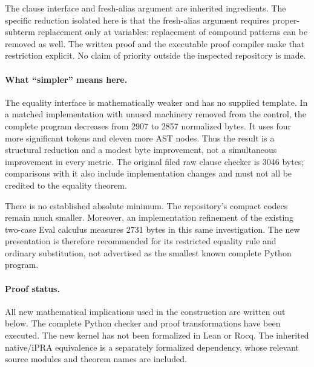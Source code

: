 The clause interface and fresh-alias argument are inherited ingredients.
The specific reduction isolated here is that the fresh-alias argument
requires proper-subterm replacement only at variables: replacement of
compound patterns can be removed as well. The written proof and the
executable proof compiler make that restriction explicit. No claim of
priority outside the inspected repository is made.

\paragraph{What ``simpler'' means here.}
The equality interface is mathematically weaker and has no supplied
template. In a matched implementation with unused machinery removed
from the control, the complete program decreases from 2907 to 2857
normalized bytes. It uses four more significant tokens and eleven more
AST nodes. Thus the result is a structural reduction and a modest byte
improvement, not a simultaneous improvement in every metric.
The original filed raw clause checker is 3046 bytes; comparisons with
it also include implementation changes and must not all be credited to
the equality theorem.

There is no established absolute minimum. The repository's compact
codecs remain much smaller. Moreover, an implementation refinement of
the existing two-case Eval calculus measures 2731 bytes in this same
investigation. The new presentation is therefore recommended for its
restricted equality rule and ordinary substitution, not advertised as
the smallest known complete Python program.

\paragraph{Proof status.}
All new mathematical implications used in the construction are written
out below. The complete Python checker and proof transformations have
been executed. The new kernel has not been formalized in Lean or Rocq.
The inherited native/iPRA equivalence is a separately formalized
dependency, whose relevant source modules and theorem names are included.

